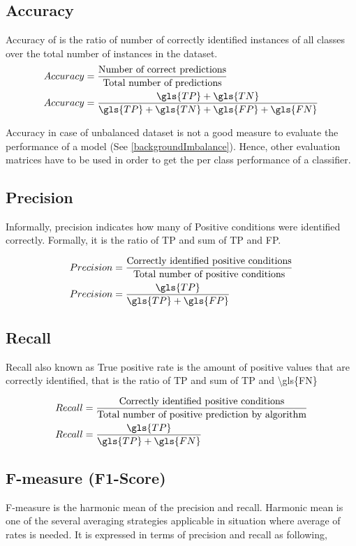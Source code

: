 \subsection*{Accuracy}
Accuracy of is the ratio of number of correctly identified instances of all classes over the total number of instances in the dataset. 
\begin{align}
    Accuracy &= \frac{\text{Number of correct predictions}}{\text{Total number of predictions}}\\
    Accuracy &= \frac{\gls{TP}+\gls{TN}}{\gls{TP}+\gls{TN}+\gls{FP}+\gls{FN}}
\end{align}

Accuracy in case of unbalanced dataset is not a good measure to evaluate the performance of a model (See \ref{backgroundImbalance}). Hence, other evaluation matrices have to be used in order to get the per class performance of a classifier.

\subsection*{Precision}
Informally, precision indicates how many of Positive conditions were identified correctly. Formally, it is the ratio of \gls{TP} and sum of \gls{TP} and \gls{FP}.

\begin{align}
    Precision &= \frac{\text{Correctly identified positive conditions}}{\text{Total number of positive conditions}}\\
    Precision &= \frac{\gls{TP}}{\gls{TP}+\gls{FP}}
\end{align}

\subsection*{Recall}
Recall also known as True positive rate is the amount of positive values that are correctly identified, that is the ratio of \gls{TP} and sum of \gls{TP} and \gls{\gls{FN}}

\begin{align}
    Recall &= \frac{\text{Correctly identified positive conditions}}{\text{Total number of positive prediction by algorithm}}\\
    Recall &= \frac{\gls{TP}}{\gls{TP}+\gls{FN}}
\end{align}

\subsection*{F-measure (F1-Score)}
F-measure is the harmonic mean of the precision and recall. Harmonic mean is one of the several averaging strategies applicable in situation where average of rates is needed. It is expressed in terms of precision and recall as following,

